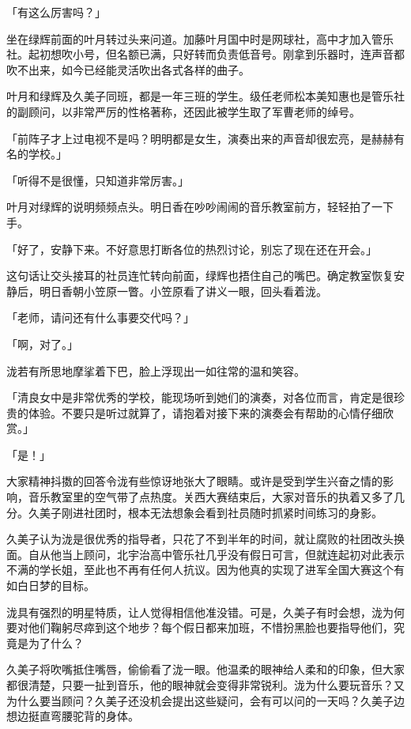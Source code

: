 \documentclass[UTF8]{ctexart}
\begin{document}
    「有这么厉害吗？」 

    坐在绿辉前面的叶月转过头来问道。加藤叶月国中时是网球社，高中才加入管乐社。起初想吹小号，但名额已满，只好转而负责低音号。刚拿到乐器时，连声音都吹不出来，如今已经能灵活吹出各式各样的曲子。 

    叶月和绿辉及久美子同班，都是一年三班的学生。级任老师松本美知惠也是管乐社的副顾问，以非常严厉的性格著称，还因此被学生取了军曹老师的绰号。 

    「前阵子才上过电视不是吗？明明都是女生，演奏出来的声音却很宏亮，是赫赫有名的学校。」 

    「听得不是很懂，只知道非常厉害。」 

    叶月对绿辉的说明频频点头。明日香在吵吵闹闹的音乐教室前方，轻轻拍了一下手。 

    「好了，安静下来。不好意思打断各位的热烈讨论，别忘了现在还在开会。」 

    这句话让交头接耳的社员连忙转向前面，绿辉也捂住自己的嘴巴。确定教室恢复安静后，明日香朝小笠原一瞥。小笠原看了讲义一眼，回头看着泷。 

    「老师，请问还有什么事要交代吗？」 

    「啊，对了。」 

    泷若有所思地摩挲着下巴，脸上浮现出一如往常的温和笑容。 

    「清良女中是非常优秀的学校，能现场听到她们的演奏，对各位而言，肯定是很珍贵的体验。不要只是听过就算了，请抱着对接下来的演奏会有帮助的心情仔细欣赏。」 

    「是！」 

    大家精神抖擞的回答令泷有些惊讶地张大了眼睛。或许是受到学生兴奋之情的影响，音乐教室里的空气带了点热度。关西大赛结束后，大家对音乐的执着又多了几分。久美子刚进社团时，根本无法想象会看到社员随时抓紧时间练习的身影。 

    久美子认为泷是很优秀的指导者，只花了不到半年的时间，就让腐败的社团改头换面。自从他当上顾问，北宇治高中管乐社几乎没有假日可言，但就连起初对此表示不满的学长姐，至此也不再有任何人抗议。因为他真的实现了进军全国大赛这个有如白日梦的目标。 

    泷具有强烈的明星特质，让人觉得相信他准没错。可是，久美子有时会想，泷为何要对他们鞠躬尽瘁到这个地步？每个假日都来加班，不惜扮黑脸也要指导他们，究竟是为了什么？ 

    久美子将吹嘴抵住嘴唇，偷偷看了泷一眼。他温柔的眼神给人柔和的印象，但大家都很清楚，只要一扯到音乐，他的眼神就会变得非常锐利。泷为什么要玩音乐？又为什么要当顾问？久美子还没机会提出这些疑问，会有可以问的一天吗？久美子边想边挺直弯腰驼背的身体。 
\end{document}
